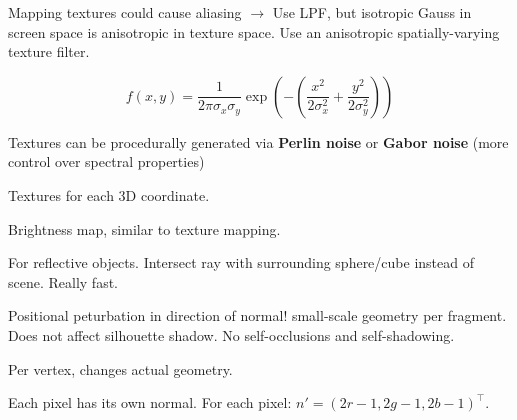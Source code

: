 \begin{theorem}
  Mapping textures could cause aliasing \(\to\)
  Use LPF, but isotropic Gauss in screen space is anisotropic in texture space.
  Use an anisotropic spatially-varying texture filter.
\end{theorem}

\begin{definition}
  \[f(x, y) = \frac{1}{2 \pi \sigma_x \sigma_y}\exp\left(- \left(\frac{x^2}{2 \sigma^2_x} + \frac{y^2}{2 \sigma_y^2}\right)\right)\]
\end{definition}

\begin{theorem}
  Textures can be procedurally generated via \textbf{Perlin noise} or \textbf{Gabor noise} (more control over spectral properties)
\end{theorem}

\begin{definition}
  Textures for each 3D coordinate.
\end{definition}

\begin{definition}
  Brightness map, similar to texture mapping.
\end{definition}

\begin{definition}
  For reflective objects. Intersect ray with surrounding sphere/cube instead of scene. Really fast.
\end{definition}

\begin{definition}
  Positional peturbation in direction of normal!
  small-scale geometry per fragment.
  Does not affect silhouette shadow.
  No self-occlusions and self-shadowing.
\end{definition}

\begin{definition}
  Per vertex, changes actual geometry.
\end{definition}

\begin{definition}
  Each pixel has its own normal.
  For each pixel: \(n' = (2r - 1, 2g - 1, 2b - 1)^\top\).
\end{definition}

